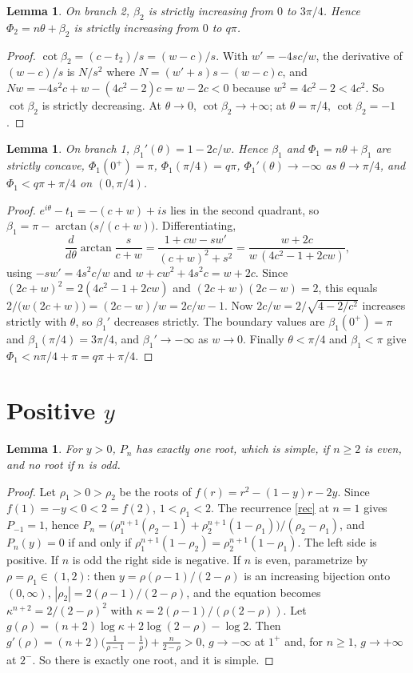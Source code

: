 \documentclass[11pt]{article}
\newtheorem{lemma}[theorem]{Lemma}
\theoremstyle{remark}\newtheorem{remark}[theorem]{Remark}
\begin{document}
\begin{lemma}\label{b2}
On branch 2, $\beta_2$ is strictly increasing from $0$ to $3\pi/4$. Hence $\Phi_2=n\theta+\beta_2$ is
strictly increasing from $0$ to $q\pi$.
\end{lemma}
\begin{proof}
$\cot\beta_2=(c-t_2)/s=(w-c)/s$. With $w'=-4sc/w$, the derivative of $(w-c)/s$ is $N/s^2$ where
$N=(w'+s)s-(w-c)c$, and $Nw=-4s^2c+w-(4c^2-2)c=w-2c<0$ because $w^2=4c^2-2<4c^2$. So $\cot\beta_2$ is
strictly decreasing. At $\theta\to0$, $\cot\beta_2\to+\infty$; at $\theta=\pi/4$, $\cot\beta_2=-1$.
\end{proof}

\begin{lemma}\label{b1}
On branch 1, $\beta_1'(\theta)=1-2c/w$. Hence $\beta_1$ and $\Phi_1=n\theta+\beta_1$ are strictly concave,
$\Phi_1(0^+)=\pi$, $\Phi_1(\pi/4)=q\pi$, $\Phi_1'(\theta)\to-\infty$ as $\theta\to\pi/4$, and
$\Phi_1<q\pi+\pi/4$ on $(0,\pi/4)$.
\end{lemma}
\begin{proof}
$e^{i\theta}-t_1=-(c+w)+is$ lies in the second quadrant, so $\beta_1=\pi-\arctan\bigl(s/(c+w)\bigr)$.
Differentiating,
\[
\frac{d}{d\theta}\arctan\frac{s}{c+w}=\frac{1+cw-sw'}{(c+w)^2+s^2}=\frac{w+2c}{w\,(4c^2-1+2cw)} ,
\]
using $-sw'=4s^2c/w$ and $w+cw^2+4s^2c=w+2c$. Since $(2c+w)^2=2(4c^2-1+2cw)$ and $(2c+w)(2c-w)=2$, this
equals $2/\bigl(w(2c+w)\bigr)=(2c-w)/w=2c/w-1$. Now $2c/w=2/\sqrt{4-2/c^2}$ increases strictly with $\theta$,
so $\beta_1'$ decreases strictly. The boundary values are $\beta_1(0^+)=\pi$ and $\beta_1(\pi/4)=3\pi/4$, and
$\beta_1'\to-\infty$ as $w\to0$. Finally $\theta<\pi/4$ and $\beta_1<\pi$ give $\Phi_1<n\pi/4+\pi=q\pi+\pi/4$.
\end{proof}

\section{Positive $y$}
\begin{lemma}\label{pos}
For $y>0$, $P_n$ has exactly one root, which is simple, if $n\ge2$ is even, and no root if $n$ is odd.
\end{lemma}
\begin{proof}
Let $\rho_1>0>\rho_2$ be the roots of $f(r)=r^2-(1-y)r-2y$. Since $f(1)=-y<0<2=f(2)$, $1<\rho_1<2$. The
recurrence \eqref{rec} at $n=1$ gives $P_{-1}=1$, hence
$P_n=\bigl(\rho_1^{n+1}(\rho_2-1)+\rho_2^{n+1}(1-\rho_1)\bigr)/(\rho_2-\rho_1)$, and $P_n(y)=0$ if and only if
$\rho_1^{n+1}(1-\rho_2)=\rho_2^{n+1}(1-\rho_1)$. The left side is positive. If $n$ is odd the right side is
negative. If $n$ is even, parametrize by $\rho=\rho_1\in(1,2)$: then $y=\rho(\rho-1)/(2-\rho)$ is an increasing
bijection onto $(0,\infty)$, $|\rho_2|=2(\rho-1)/(2-\rho)$, and the equation becomes
$\kappa^{n+2}=2/(2-\rho)^2$ with $\kappa=2(\rho-1)/(\rho(2-\rho))$. Let
$g(\rho)=(n+2)\log\kappa+2\log(2-\rho)-\log2$. Then
$g'(\rho)=(n+2)\bigl(\tfrac1{\rho-1}-\tfrac1\rho\bigr)+\tfrac{n}{2-\rho}>0$, $g\to-\infty$ at $1^+$ and, for
$n\ge1$, $g\to+\infty$ at $2^-$. So there is exactly one root, and it is simple.
\end{proof}
\end{document}
